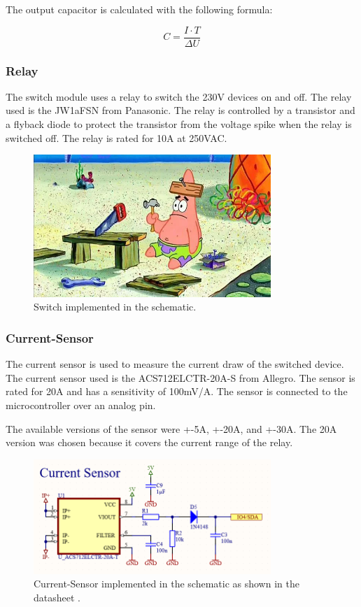         The output capacitor is calculated with the following formula:

        \begin{equation}
            C = \frac{I \cdot T}{\Delta U}
        \end{equation}

    \subsubsection{Relay}
        The switch module uses a relay to switch the 230V devices on and off. The relay used is 
        the JW1aFSN from Panasonic. The relay is controlled by a transistor and a flyback diode
        to protect the transistor from the voltage spike when the relay is switched off. The relay
        is rated for 10A at 250VAC.

        \begin{figure}[H]
            \centering
            \includegraphics[width=0.8\textwidth]{assets/HW/TBD.png}
            \caption{Switch implemented in the schematic.}
        \end{figure}
    
    \subsubsection{Current-Sensor}

        The current sensor is used to measure the current draw of the switched device. The current
        sensor used is the ACS712ELCTR-20A-S from Allegro. The sensor is rated for 20A and has a sensitivity of 
        100mV/A. The sensor is connected to the microcontroller over an analog pin.

        The available versions of the sensor were +-5A, +-20A, and +-30A. The 20A version was 
        chosen because it covers the current range of the relay.

        
        

        \begin{figure}[H]
            \centering
            \includegraphics[width=0.8\textwidth]{assets/HW/Current-Sensor-schematic.png}
            \caption{Current-Sensor implemented in the schematic as shown in the datasheet \cite{}.}
        \end{figure}